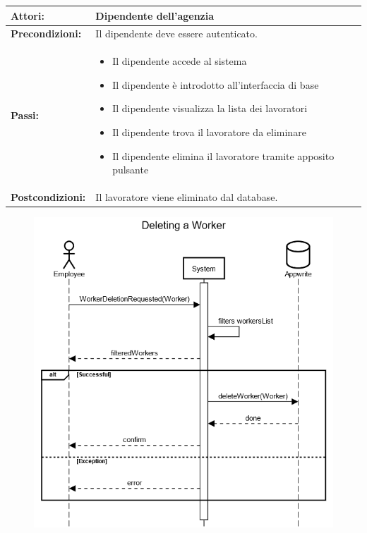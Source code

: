 \documentclass[a4paper, oneside, 12pt]{article}
\begin{document}
\begin{tabular}{ | l | p{11cm} | } 
	\hline
	\textbf{Attori:} & Dipendente dell'agenzia  \\ 
	\hline
	\textbf{Precondizioni:} & Il dipendente deve essere autenticato. \\
	\hline
	\textbf{Passi:} &
		\begin{itemize}
			\item Il dipendente accede al sistema
			\item Il dipendente è introdotto all'interfaccia di base
			\item Il dipendente visualizza la lista dei lavoratori
			\item Il dipendente trova il lavoratore da eliminare
			\item Il dipendente elimina il lavoratore tramite apposito pulsante
		\end{itemize} \\
	\hline
	\textbf{Postcondizioni:} &  Il lavoratore viene eliminato dal database. \\
	\hline
  \end{tabular}



\begin{figure}[h!]
	\centering
	\includegraphics[width = 8 cm]{images/rimozione}
	\label{fig:Ricerca lavoratore}
\end{figure}
\end{document}
